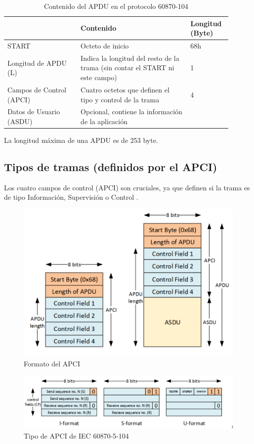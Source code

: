 \documentclass[a5paper]{book}%
\begin{document}
\begin{table}[H]
	\centering
	\caption{Contenido del APDU en el protocolo 60870-104}
\begin{tabular}{|p{0.3\linewidth}|p{0.45\linewidth}|p{0.15\linewidth}|}
  \hline
\rowcolor{black} \color{white}{Campo}&\color{white}Contenido& \color{white}Longitud (Byte)\\\hline
START&	Octeto de inicio&68h\\\hline		
Longitud de APDU (L)&Indica la longitud del resto de la trama (sin contar el START ni este campo)&1\\\hline
Campos de Control (APCI)	&Cuatro octetos que definen el tipo y control de la trama&	4\\\hline		
Datos de Usuario (ASDU)&Opcional, contiene la información de la aplicación& \\\hline
  \end{tabular}
\end{table}

  La longitud máxima de una APDU es de 253 byte.

  \subsection{Tipos de tramas (definidos por el APCI)}


  Los cuatro campos de control (APCI) son cruciales, ya que definen si la trama es de tipo Información, Supervisión o Control \cite{GOMEZ2019}.
  
  
\begin{figure}[H]
  	\centering
  	\caption{Formato del APCI}
  	\label{fig:cabecera104}
  	\includegraphics[width=0.7\linewidth]{cabecera_104}
\end{figure}
  
  
\begin{figure}[H]
	\centering
	\caption{Tipo de APCI de IEC 60870-5-104}
	\label{fig:tramas104}
	\includegraphics[width=0.7\linewidth]{tramas_104_}
\end{figure}
  
\end{document}
